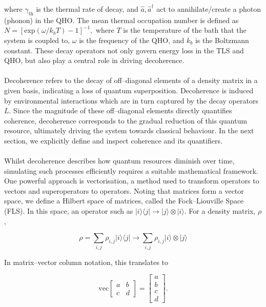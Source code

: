 \documentclass[12pt]{article}
\begin{document}
where $\gamma_{\scriptscriptstyle \text{th}}$ is the thermal rate of decay, and $\hat{a},\hat{a}^\dagger$ act to annihilate/create a photon (phonon) in the QHO. The mean thermal occupation number is defined as $N = [\text{exp}(\omega/k_bT) -1]^{-1},$ where $T$ is the temperature of the bath that the system is coupled to, $\omega$ is the frequency of the QHO, and $k_b$ is the Boltzmann constant. These decay operators not only govern energy loss in the TLS and QHO, but also play a central role in driving decoherence.\\
\\
Decoherence refers to the decay of off--diagonal elements of a density matrix in a given basis, indicating a loss of quantum superposition. Decoherence is induced by environmental interactions which are in turn captured by the decay operators $L$. Since the magnitude of these off–diagonal elements directly quantifies coherence, decoherence corresponds to the gradual reduction of this quantum resource, ultimately driving the system towards classical behaviour. In the next section, we explicitly define and inspect coherence and its quantifiers. \\
\\
Whilst decoherence describes how quantum resources diminish over time, simulating such processes efficiently requires a suitable mathematical framework. One powerful approach is vectorisation, a method used to transform operators to vectors and superoperators to operators. Noting that matrices form a vector space, we define a Hilbert space of matrices, called the Fock--Liouville Space (FLS). In this space, an operator such as $|i\rangle\langle j| \rightarrow |j\rangle \otimes |i\rangle$. For a density matrix, $\rho$, 

\begin{equation*}
    \rho = \sum_{i,j}\rho_{i,j}|i\rangle\langle j| \rightarrow \sum_{i,j}\rho_{i,j}|i\rangle\otimes |j\rangle
\end{equation*}

In matrix--vector column notation, this translates to 

\begin{equation*}
    \text{vec}\begin{bmatrix}
        a & b \\
        c & d
    \end{bmatrix}
    = \begin{bmatrix}
        a\\
        b\\
        c\\
        d
    \end{bmatrix}.
\end{equation*}
\end{document}
